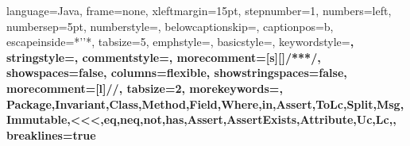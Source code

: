 \usepackage{graphicx}
\usepackage{url}
\usepackage[listings]{tcolorbox}
\usepackage{amssymb}
\usepackage{pifont}

\newcommand{\critics}{{\small{\sc{Critics}}}}
\newcommand{\phabricator}{{\small{\sc{Phabricator}}}}
\newcommand{\gerrit}{{\small{\sc{Gerrit}}}}
\newcommand{\codeflow}{{\small{\sc{CodeFlow}}}}
\newcommand{\collaborator}{{\small{\sc{Collaborator}}}}
\newcommand{\clusterchanges}{{\small{\sc{ClusterChanges}}}}
\newcommand{\delCode}{\textcolor{black}}
\newcommand{\addCode}{\textcolor{black}}
\newcommand{\ttt}[1]{\tt\small{#1}}



 {
  language=Java,
  frame=none,
  xleftmargin=15pt, 
  stepnumber=1, 
  numbers=left, 
  numbersep=5pt,
  numberstyle=\tiny\color[gray]{0.777}, 
  belowcaptionskip=\bigskipamount,
  captionpos=b, 
  escapeinside={*'}{'*},
  tabsize=5,
  emphstyle={\bf},
  basicstyle=\scriptsize\ttfamily,
  keywordstyle=\color{javapurple}\bfseries,
  stringstyle=\color{javared},
  commentstyle=\color{javagreen},
  morecomment=[s][\color{javadocblue}]{/**}{*/},
  showspaces=false,
  columns=flexible,
  showstringspaces=false,
  morecomment=[l]{//},
  tabsize=2,
  morekeywords={, Package,Invariant,Class,Method,Field,Where,in,Assert,ToLc,Split,Msg,Immutable,<<<,eq,neq,not,has,Assert,AssertExists,Attribute,Uc,Lc,},
  breaklines=true
}